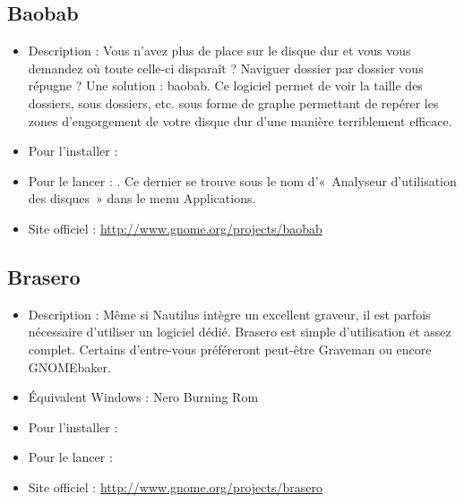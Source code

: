 \subsection{Baobab}
\begin{itemize}
\begingroup
{}
\item Description : Vous n'avez plus de place sur le disque dur et vous vous demandez où toute celle-ci disparaît ? Naviguer dossier par dossier vous répugne ? Une solution : baobab. Ce logiciel permet de voir la taille des dossiers, sous dossiers, etc. sous forme de graphe permettant de repérer les zones d'engorgement de votre disque dur d'une manière terriblement efficace.{\par}
\endgroup
\item Pour l'installer : 
\item Pour le lancer : . Ce dernier se trouve sous le nom d'«~Analyseur d'utilisation des disques~» dans le menu Applications.{\par}
\item Site officiel : \url{http://www.gnome.org/projects/baobab}{\par}
\end{itemize}
\subsection{Brasero}
\label{RefInstallBrasero}
\begin{itemize}
\begingroup
{}
\item Description : Même si Nautilus intègre un excellent graveur, il est parfois nécessaire d'utiliser un logiciel dédié. Brasero est simple d'utilisation et assez complet. Certains d'entre-vous préféreront peut-être Graveman ou encore GNOMEbaker.{\par}
\item Équivalent Windows : Nero Burning Rom{\par}
\item Pour l'installer : 
\item Pour le lancer : 
\item Site officiel : \url{http://www.gnome.org/projects/brasero}{\par}
\endgroup
\end{itemize}
